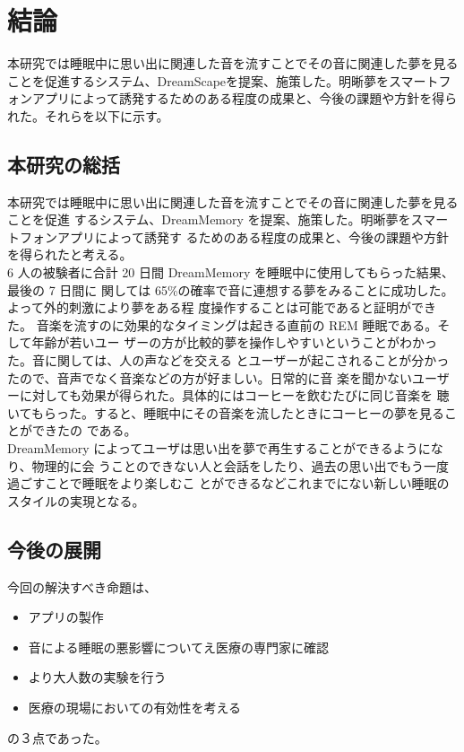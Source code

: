 \chapter{結論}
\label{chap:conclusion}
本研究では睡眠中に思い出に関連した音を流すことでその音に関連した夢を見ることを促進するシステム、DreamScapeを提案、施策した。明晰夢をスマートフォンアプリによって誘発するためのある程度の成果と、今後の課題や方針を得られた。それらを以下に示す。

\section{本研究の総括}

 本研究では睡眠中に思い出に関連した音を流すことでその音に関連した夢を見ることを促進 するシステム、DreamMemory を提案、施策した。明晰夢をスマートフォンアプリによって誘発す るためのある程度の成果と、今後の課題や方針を得られたと考える。\\
  6 人の被験者に合計 20 日間 DreamMemory を睡眠中に使用してもらった結果、最後の 7 日間に 関しては 65\%の確率で音に連想する夢をみることに成功した。よって外的刺激により夢をある程 度操作することは可能であると証明ができた。  音楽を流すのに効果的なタイミングは起きる直前の REM 睡眠である。そして年齢が若いユー ザーの方が比較的夢を操作しやすいということがわかった。音に関しては、人の声などを交える とユーザーが起こされることが分かったので、音声でなく音楽などの方が好ましい。日常的に音 楽を聞かないユーザーに対しても効果が得られた。具体的にはコーヒーを飲むたびに同じ音楽を 聴いてもらった。すると、睡眠中にその音楽を流したときにコーヒーの夢を見ることができたの である。\\
  DreamMemory によってユーザは思い出を夢で再生することができるようになり、物理的に会 うことのできない人と会話をしたり、過去の思い出でもう一度過ごすことで睡眠をより楽しむこ とができるなどこれまでにない新しい睡眠のスタイルの実現となる。


\section{今後の展開}

今回の解決すべき命題は、
\begin{itemize}
\item アプリの製作
\item 音による睡眠の悪影響についてえ医療の専門家に確認 
\item より大人数の実験を行う
\item 医療の現場においての有効性を考える
\end{itemize}
の３点であった。

